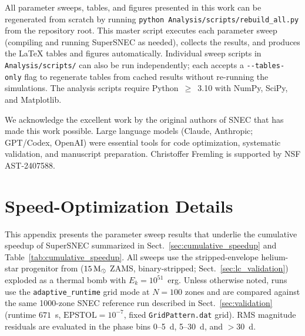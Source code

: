 \documentclass[twocolumn,linenumbers]{aastex701}
\begin{document}
All parameter sweeps, tables, and figures presented in this work can be regenerated from scratch by running \texttt{python Analysis/\-scripts/\-rebuild\_all.py} from the repository root. This master script executes each parameter sweep (compiling and running SuperSNEC as needed), collects the results, and produces the \LaTeX{} tables and figures automatically. Individual sweep scripts in \texttt{Analysis/\-scripts/} can also be run independently; each accepts a \texttt{-{}-tables-only} flag to regenerate tables from cached results without re-running the simulations. The analysis scripts require Python~$\geq$~3.10 with NumPy, SciPy, and Matplotlib.

\begin{acknowledgments}
We acknowledge the excellent work by the original authors of SNEC that has made this work possible. Large language models (Claude, Anthropic; GPT/Codex, OpenAI) were essential tools for code optimization, systematic validation, and manuscript preparation. Christoffer Fremling is supported by NSF AST-2407588.
\end{acknowledgments}


\appendix

\section{Speed-Optimization Details}
\label{sec:speed_details}

This appendix presents the parameter sweep results that underlie the cumulative speedup of SuperSNEC summarized in Sect.~\ref{sec:cumulative_speedup} and Table~\ref{tab:cumulative_speedup}. All sweeps use the stripped-envelope helium-star progenitor from \citet{PiroMorozova2014,Morozova2015} ($15\,{\rm M}_\odot$ ZAMS, binary-stripped; Sect.~\ref{sec:lc_validation}) exploded as a thermal bomb with $E_k = 10^{51}$~erg. Unless otherwise noted, runs use the \texttt{adaptive\_runtime} grid mode at $N = 100$ zones and are compared against the same 1000-zone SNEC reference run described in Sect.~\ref{sec:validation} (runtime $671$~s, $\mathrm{EPSTOL} = 10^{-7}$, fixed \texttt{GridPattern.dat} grid). RMS magnitude residuals are evaluated in the phase bins 0--5~d, 5--30~d, and $>30$~d.
\end{document}
